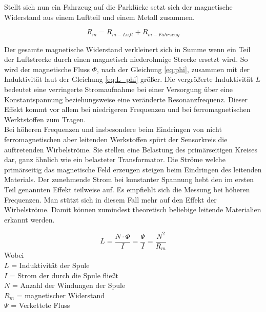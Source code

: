 Stellt sich nun ein Fahrzeug auf die Parklücke setzt sich der magnetische Widerstand aus einem Luftteil und einem Metall zusammen.

\begin{equation} \label{eq:rm_ges}
    R_{m} = R_{m-Luft} + R_{m-Fahrzeug}
\end{equation}

Der gesamte magnetische Widerstand verkleinert sich in Summe wenn ein Teil der Luftstrecke durch einen magnetisch niederohmige Strecke ersetzt wird.
So wird der magnetische Fluss $\Phi$, nach der Gleichung \ref{eq:phi}, zusammen mit der Induktivität laut der Gleichung \ref{eq:L_phi} größer.
Die vergrößerte Induktivität $L$ bedeutet eine verringerte Stromaufnahme bei einer Versorgung über eine Konstantspannung
beziehungsweise eine veränderte Resonanzfrequenz. Dieser Effekt kommt vor allem bei niedrigeren Frequenzen und bei ferromagnetischen Werktstoffen zum Tragen.
\\
Bei höheren Frequenzen und insbesondere beim Eindringen von nicht ferromagnetischen aber leitenden Werkstoffen spürt der Sensorkreis die auftretenden Wirbelströme.
Sie stellen eine Belastung des primärseitigen Kreises dar, ganz ähnlich wie ein belasteter Transformator. 
Die Ströme welche primärseitig das magnetische Feld erzeugen steigen beim Eindringen des leitenden Materials.
Der zunehmende Strom bei konstanter Spannung hebt den im ersten Teil genannten Effekt teilweise auf. Es empfiehlt sich die Messung bei höheren Frequenzen. 
Man stützt sich in diesem Fall mehr auf den Effekt der Wirbelströme. 
Damit können zumindest theoretisch beliebige leitende Materialien erkannt werden.
\begin{comment}


    Bei gleich bleibendem Feld nimmt die Stromaufnahme durch die kleinere Induktivität ab. Dies ist vor allem bei ferromagnetischen Materialien der Fall.

Umgekehrt wirkt sich ein magnetisch hochohmiger Widerstand steigernd auf den Strom und senkend auf die Induktivität aus. Ein Effekt der
 den magnetischen Widerstand erhöht ist das Auftreten von Wirbelströmen in Leitern.


\end{comment}

\begin{equation} \label{eq:L_phi}
    L = \frac{N \cdot \Phi}{I} = \frac{\Psi}{I} = \frac{N^{2}}{R_{m}}
\end{equation}
Wobei \\
$L$ = Induktivität der Spule \\
$I$ = Strom der durch die Spule fließt \\
$N$ = Anzahl der Windungen der Spule \\
$R_{m}$ = magnetischer Widerstand \\
$\Psi$ = Verkettete Fluss


